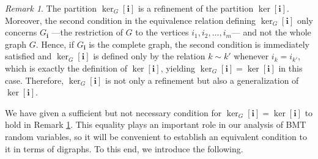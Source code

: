 \documentclass[a4paper,12pt]{extarticle}
\theoremstyle{definition}
\newtheorem{defn}[thm]{Definition}
\theoremstyle{remark}
\newtheorem{rem}[thm]{Remark}
\newtheorem{nota}[thm]{Notation}
\newtheorem{exa}[thm]{Example}
\begin{document}
\begin{rem}\label{rmk:kernel_g_extension}
%
The partition $\ker_G[\bm{i}]$  is a refinement of the partition $\ker[\bm{i}]$. 
%
Moreover, the second condition in the equivalence relation defining $\ker_G[\bm{i}]$ only concerns $G_{\bm{i}}$ ---the restriction of $G$ to the vertices $i_1,i_2, \ldots, i_m$--- and not the whole graph $G$. 
%
Hence, if $G_{\bm{i}}$ is the complete graph, the second condition is immediately satisfied and $\ker_G[\bm{i}]$ is defined only by the relation $k \sim k'$ whenever $i_k = i_{k'}$, which is exactly the definition of $\ker[\bm{i}]$, yielding $\ker_G[\bm{i}]=\ker[\bm{i}]$ in this case. 
%
Therefore, $\ker_G[\bm{i}]$ is not only a refinement but also a generalization of $\ker[\bm i]$. 	
%
\end{rem}





We have given a sufficient but not necessary condition for $\ker_G[\bm{i}]=\ker[\bm{i}]$ to hold in Remark \ref{rmk:kernel_g_extension}. 
%
This equality plays an important role in our analysis of BMT random variables, 
%
so it will be convenient to establish an equivalent condition to it in terms of digraphs. 
%
To this end, we introduce the following. 
%
%
%
\end{document}
